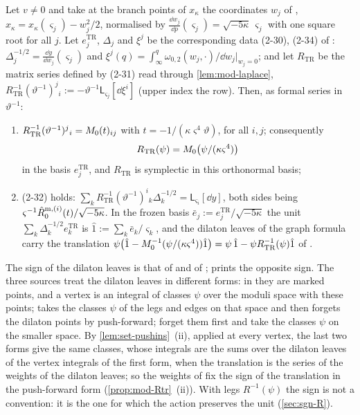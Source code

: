 \begin{prop}
\label{prop:mod-Rtr}
Let $v\neq 0$ and take at the branch points of $x_\kappa$ the coordinates $w_j$ of \cite[\S2.6]{Dunin-Barkowski:2015caa}, $x_\kappa=x_\kappa(\varsigma_j)-w_j^2/2$, normalised by $\frac{\dd w_j}{\dd p}(\varsigma_j)=\sqrt{-5\kappa}\,\varsigma_j$ with one square root for all $j$. Let $e^{\mathrm{TR}}_j$, $\Delta_j$ and $\xi^j$ be the corresponding data (2-30), (2-34) of \cite[\S2.6]{Dunin-Barkowski:2015caa}: $\Delta_j^{-1/2}=\frac{\dd y}{\dd w_j}(\varsigma_j)$ and $\xi^j(q)=\int_\infty^q\omega_{0,2}(w_j,\cdot)/\dd w_j|_{w_j=0}$; and let $R_{\mathrm{TR}}$ be the matrix series defined by (2-31) read through \cref{lem:mod-laplace}, $R_{\mathrm{TR}}^{-1}(\vartheta^{-1})^j{}_i:=-\vartheta^{-1}\mathsf L_{\varsigma_j}[\dd\xi^i]$ (upper index the row). Then, as formal series in $\vartheta^{-1}$:
\begin{enumerate}
\item $R_{\mathrm{TR}}^{-1}(\vartheta^{-1})^j{}_i=M_{0}(t)_{ij}$ with $t=-1/(\kappa\varsigma^4\vartheta)$, for all $i,j$; consequently
\begin{equation}
\label{eq:mod-Rtr}
R_{\mathrm{TR}}(\psi)=M_{0}\big(\psi/(\kappa\varsigma^4)\big)
\end{equation}
in the basis $e^{\mathrm{TR}}_j$, and $R_{\mathrm{TR}}$ is symplectic in this orthonormal basis;
\item (2-32) holds: $\sum_kR_{\mathrm{TR}}^{-1}(\vartheta^{-1})^i{}_k\Delta_k^{-1/2}=\mathsf L_{\varsigma_i}[\dd y]$, both sides being $\varsigma^{-1}\hat{R}^{\mathrm m,(i)}_0(t)/\sqrt{-5\kappa}$. In the frozen basis $\bar e_j:=e^{\mathrm{TR}}_j/\sqrt{-5\kappa}$ the unit $\sum_k\Delta_k^{-1/2}e^{\mathrm{TR}}_k$ is $\hat 1:=\sum_k\bar e_k/\varsigma_k$, and the dilaton leaves of the graph formula carry the translation $\psi\big(\hat 1-M_{0}^{-1}(\psi/(\kappa\varsigma^4))\hat 1\big)=\psi\,\hat 1-\psi R_{\mathrm{TR}}^{-1}(\psi)\hat 1$ of \cite[Def.~2.13]{PPZ15}.
\end{enumerate}
\end{prop}

The sign of the dilaton leaves is that of \cite[\S2.3]{DuninBarkowski:2012bw} and of \cite[Prop.~2.12, Def.~2.13]{PPZ15}; \cite[\S2.3]{Dunin-Barkowski:2015caa} prints the opposite sign. The three sources treat the dilaton leaves in different forms: in \cite[\S2.3]{DuninBarkowski:2012bw} they are marked points, and a vertex is an integral of classes $\psi$ over the moduli space with these points; \cite[\S2.3]{Dunin-Barkowski:2015caa} takes the classes $\psi$ of the legs and edges on that space and then forgets the dilaton points by push-forward; \cite[Defs.~2.2, 2.5]{PPZ15} forget them first and take the classes $\psi$ on the smaller space. By \cref{lem:set-pushins}~(ii), applied at every vertex, the last two forms give the same classes, whose integrals are the sums over the dilaton leaves of the vertex integrals of the first form, when the translation is the series of the weights of the dilaton leaves; so the weights of \cite[\S2.3]{DuninBarkowski:2012bw} fix the sign of the translation in the push-forward form (\cref{prop:mod-Rtr}~(ii)). With legs $R^{-1}(\psi)$ the sign is not a convention: it is the one for which the action preserves the unit (\cref{sec:sgn-R}).


